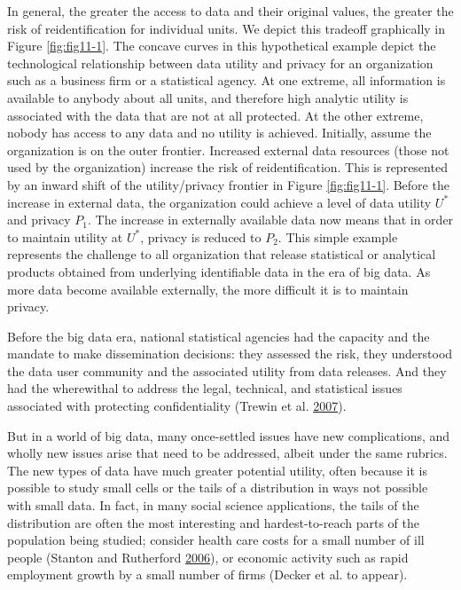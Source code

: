 \documentclass[]{krantz}
\begin{document}
\vspace*{-12pt} In general, the greater the access to data and their
original values, the greater the risk of reidentification for individual
units. We depict this tradeoff graphically in Figure \ref{fig:fig11-1}.
The concave curves in this hypothetical example depict the technological
relationship between data utility and privacy for an organization such
as a business firm or a statistical agency. At one extreme, all
information is available to anybody about all units, and therefore high
analytic utility is associated with the data that are not at all
protected. At the other extreme, nobody has access to any data and no
utility is achieved. Initially, assume the organization is on the outer
frontier. Increased external data resources (those not used by the
organization) increase the risk of reidentification. This is represented
by an inward shift of the utility/privacy frontier in Figure
\ref{fig:fig11-1}. Before the increase in external data, the
organization could achieve a level of data utility \(U^*\) and privacy
\(P_1\). The increase in externally available data now means that in
order to maintain utility at \(U^*\), privacy is reduced to \(P_2\).
This simple example represents the challenge to all organization that
release statistical or analytical products obtained from underlying
identifiable data in the era of big data. As more data become available
externally, the more difficult it is to maintain privacy.

Before the big data era, national statistical agencies had the capacity
and the mandate to make dissemination decisions: they assessed the risk,
they understood the data user community and the associated utility from
data releases. And they had the wherewithal to address the legal,
technical, and statistical issues associated with protecting
confidentiality (Trewin et al.
\protect\hyperlink{ref-trewin2007managing}{2007}).

But in a world of big data, many once-settled issues have new
complications, and wholly new issues arise that need to be addressed,
albeit under the same rubrics. The new types of data have much greater
potential utility, often because it is possible to study small cells or
the tails of a distribution in ways not possible with small data. In
fact, in many social science applications, the tails of the distribution
are often the most interesting and hardest-to-reach parts of the
population being studied; consider health care costs for a small number
of ill people (Stanton and Rutherford
\protect\hyperlink{ref-stanton2006high}{2006}), or economic activity
such as rapid employment growth by a small number of firms (Decker et
al. to appear).
\end{document}
